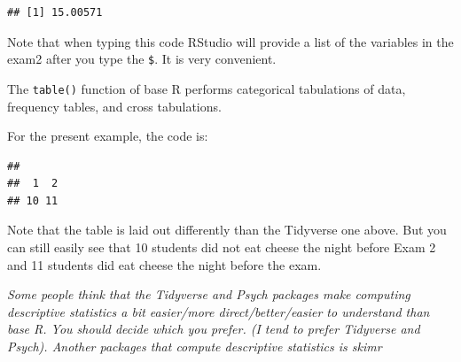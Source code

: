 \documentclass[
]{book}
\newenvironment{Shaded}{\begin{snugshade}}{\end{snugshade}}
\newcommand{\KeywordTok}[1]{\textcolor[rgb]{0.13,0.29,0.53}{\textbf{#1}}}
\newcommand{\NormalTok}[1]{#1}
\newcommand{\OperatorTok}[1]{\textcolor[rgb]{0.81,0.36,0.00}{\textbf{#1}}}
\begin{document}
\begin{Shaded}
\end{Shaded}

\begin{verbatim}
## [1] 15.00571
\end{verbatim}

Note that when typing this code RStudio will provide a list of the variables in the exam2 after you type the \texttt{\$}. It is very convenient.

The \texttt{table()} function of base R performs categorical tabulations of data, frequency tables, and cross tabulations.

For the present example, the code is:

\begin{Shaded}
\end{Shaded}

\begin{verbatim}
## 
##  1  2 
## 10 11
\end{verbatim}

Note that the table is laid out differently than the Tidyverse one above. But you can still easily see that 10 students did not eat cheese the night before Exam 2 and 11 students did eat cheese the night before the exam.

\emph{Some people think that the Tidyverse and Psych packages make computing descriptive statistics a bit easier/more direct/better/easier to understand than base R. You should decide which you prefer. (I tend to prefer Tidyverse and Psych). Another packages that compute descriptive statistics is skimr }

  
\end{document}
